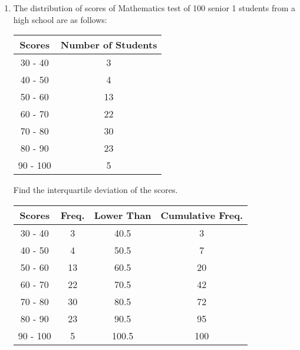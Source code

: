 \documentclass{report}
\begin{document}
\begin{multicols}{2}
\begin{enumerate}
    \item The distribution of scores of Mathematics test of 100 senior 1 students from a
          high school are as follows:
          \begin{center}
            \begin{tabular}{|c|c|}
              \hline
              Scores   & Number of Students \\
              \hline
              30 - 40  & 3                  \\
              40 - 50  & 4                  \\
              50 - 60  & 13                 \\
              60 - 70  & 22                 \\
              70 - 80  & 30                 \\
              80 - 90  & 23                 \\
              90 - 100 & 5                  \\
              \hline
            \end{tabular}
          \end{center}
          Find the interquartile deviation of the scores.
          \sol{}
          \begin{center}
            \begin{tabular}{|c|c|c|c|}
              \hline
              Scores   & Freq. & Lower Than & Cumulative Freq. \\
              \hline
              30 - 40  & 3     & 40.5       & 3                \\
              40 - 50  & 4     & 50.5       & 7                \\
              50 - 60  & 13    & 60.5       & 20               \\
              60 - 70  & 22    & 70.5       & 42               \\
              70 - 80  & 30    & 80.5       & 72               \\
              80 - 90  & 23    & 90.5       & 95               \\
              90 - 100 & 5     & 100.5      & 100              \\
              \hline
            \end{tabular}
          \end{center}


\end{enumerate}
\end{multicols}
\end{document}
